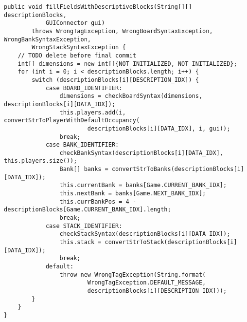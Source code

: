 \begin{lstlisting}[style=CodeHighlighting,float,caption=Converter - fillFieldsWithDescriptiveBlocks,label=lst:converter_fillFieldsWithDescriptiveBlocks]
public void fillFieldsWithDescriptiveBlocks(String[][] descriptionBlocks, 
			GUIConnector gui)
        throws WrongTagException, WrongBoardSyntaxException, WrongBankSyntaxException,
        WrongStackSyntaxException {
    // TODO delete before final commit
    int[] dimensions = new int[]{NOT_INITIALIZED, NOT_INITIALIZED};
    for (int i = 0; i < descriptionBlocks.length; i++) {
        switch (descriptionBlocks[i][DESCRIPTION_IDX]) {
            case BOARD_IDENTIFIER:
                dimensions = checkBoardSyntax(dimensions, descriptionBlocks[i][DATA_IDX]);
                this.players.add(i, convertStrToPlayerWithDefaultOccupancy(
                        descriptionBlocks[i][DATA_IDX], i, gui));
                break;
            case BANK_IDENTIFIER:
                checkBankSyntax(descriptionBlocks[i][DATA_IDX], this.players.size());
                Bank[] banks = convertStrToBanks(descriptionBlocks[i][DATA_IDX]);
                this.currentBank = banks[Game.CURRENT_BANK_IDX];
                this.nextBank = banks[Game.NEXT_BANK_IDX];
                this.currBankPos = 4 - descriptionBlocks[Game.CURRENT_BANK_IDX].length;
                break;
            case STACK_IDENTIFIER:
                checkStackSyntax(descriptionBlocks[i][DATA_IDX]);
                this.stack = convertStrToStack(descriptionBlocks[i][DATA_IDX]);
                break;
            default:
                throw new WrongTagException(String.format(
                		WrongTagException.DEFAULT_MESSAGE, 
                		descriptionBlocks[i][DESCRIPTION_IDX]));
        }
    }
}
\end{lstlisting}
